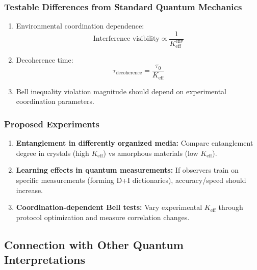 \documentclass[11pt,a4paper]{article}
\begin{document}
	\subsubsection{Testable Differences from Standard Quantum Mechanics}
	\begin{enumerate}
		\item Environmental coordination dependence:
		\begin{equation}
			\text{Interference visibility} \propto \frac{1}{K_{\mathrm{eff}}^{\text{env}}}
		\end{equation}
		
		\item Decoherence time:
		\begin{equation}
			\tau_{\text{decoherence}} = \frac{\tau_0}{K_{\mathrm{eff}}}
		\end{equation}
		
		\item Bell inequality violation magnitude should depend on experimental coordination parameters.
	\end{enumerate}
	
	\subsubsection{Proposed Experiments}
	\begin{enumerate}
		\item \textbf{Entanglement in differently organized media:} Compare entanglement degree in crystals (high $K_{\mathrm{eff}}$) vs amorphous materials (low $K_{\mathrm{eff}}$).
		
		\item \textbf{Learning effects in quantum measurements:} If observers train on specific measurements (forming D+I dictionaries), accuracy/speed should increase.
		
		\item \textbf{Coordination-dependent Bell tests:} Vary experimental $K_{\mathrm{eff}}$ through protocol optimization and measure correlation changes.
	\end{enumerate}
	
	\subsection{Connection with Other Quantum Interpretations}
	\label{subsec:interpretations}
	
\end{document}
